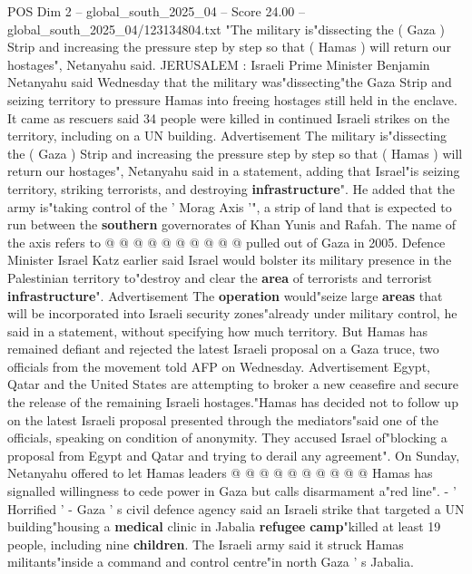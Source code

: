 \begin{textsample}{POS Dim 2 – global\_south\_2025\_04 – Score 24.00 – global\_south\_2025\_04/123134804.txt}  \label{ex:f2_pos_277}
"The military is"dissecting the ( Gaza ) Strip and increasing the pressure step by step so that ( Hamas ) will return our hostages", Netanyahu said.
JERUSALEM : Israeli Prime Minister Benjamin Netanyahu said Wednesday that the military was"dissecting"the Gaza Strip and seizing territory to pressure Hamas into freeing hostages still held in the enclave.
It came as rescuers said 34 people were killed in continued Israeli strikes on the territory, including on a UN building.
Advertisement The military is"dissecting the ( Gaza ) Strip and increasing the pressure step by step so that ( Hamas ) will return our hostages", Netanyahu said in a statement, adding that Israel"is seizing territory, striking terrorists, and destroying \textbf{infrastructure}".
He added that the army is"taking control of the ' Morag Axis '", a strip of land that is expected to run between the \textbf{southern} governorates of Khan Yunis and Rafah.
The name of the axis refers to @ @ @ @ @ @ @ @ @ @ pulled out of Gaza in 2005.
Defence Minister Israel Katz earlier said Israel would bolster its military presence in the Palestinian territory to"destroy and clear the \textbf{area} of terrorists and terrorist \textbf{infrastructure}".
Advertisement The \textbf{operation} would"seize large \textbf{areas} that will be incorporated into Israeli security zones"already under military control, he said in a statement, without specifying how much territory.
But Hamas has remained defiant and rejected the latest Israeli proposal on a Gaza truce, two officials from the movement told AFP on Wednesday.
Advertisement Egypt, Qatar and the United States are attempting to broker a new ceasefire and secure the release of the remaining Israeli hostages."Hamas has decided not to follow up on the latest Israeli proposal presented through the mediators"said one of the officials, speaking on condition of anonymity.
They accused Israel of"blocking a proposal from Egypt and Qatar and trying to derail any agreement".
On Sunday, Netanyahu offered to let Hamas leaders @ @ @ @ @ @ @ @ @ @ Hamas has signalled willingness to cede power in Gaza but calls disarmament a"red line". - ' Horrified ' - Gaza ' s civil defence agency said an Israeli strike that targeted a UN building"housing a \textbf{medical} clinic in Jabalia \textbf{refugee} \textbf{camp}"killed at least 19 people, including nine \textbf{children}.
The Israeli army said it struck Hamas militants"inside a command and control centre"in north Gaza ' s Jabalia.

\end{textsample}
